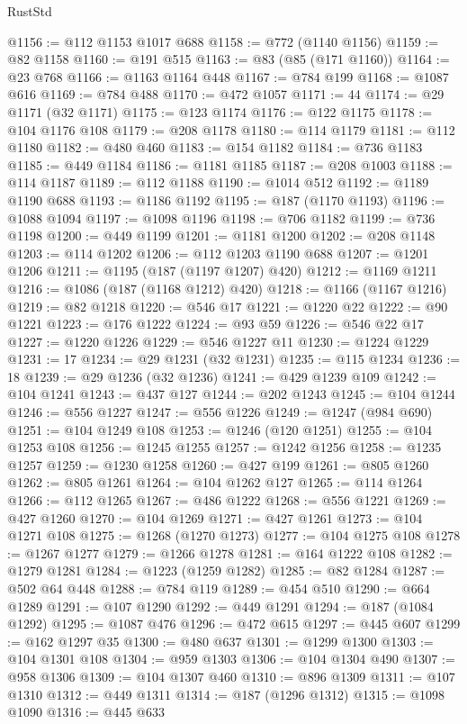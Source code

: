 \begin{lexlean}{RustStd}
\begin{coremodule}
{\begin{coremodule}
{{{{{{{{{{{{{{{{{{{{{{{{{{{{{{{{{{{{{{{{{{{{{{{{{{{{{{{@1156 := @112 @1153 @1017 @688
@1158 := @772 (@1140 @1156)
@1159 := @82 @1158
@1160 := @191 @515
@1163 := @83 (@85 (@171 @1160))
@1164 := @23 @768
@1166 := @1163 @1164 @448
@1167 := @784 @199
@1168 := @1087 @616
@1169 := @784 @488
@1170 := @472 @1057
@1171 := 44
@1174 := @29 @1171 (@32 @1171)
@1175 := @123 @1174
@1176 := @122 @1175
@1178 := @104 @1176 @108
@1179 := @208 @1178
@1180 := @114 @1179
@1181 := @112 @1180
@1182 := @480 @460
@1183 := @154 @1182
@1184 := @736 @1183
@1185 := @449 @1184
@1186 := @1181 @1185
@1187 := @208 @1003
@1188 := @114 @1187
@1189 := @112 @1188
@1190 := @1014 @512
@1192 := @1189 @1190 @688
@1193 := @1186 @1192
@1195 := @187 (@1170 @1193)
@1196 := @1088 @1094
@1197 := @1098 @1196
@1198 := @706 @1182
@1199 := @736 @1198
@1200 := @449 @1199
@1201 := @1181 @1200
@1202 := @208 @1148
@1203 := @114 @1202
@1206 := @112 @1203 @1190 @688
@1207 := @1201 @1206
@1211 := @1195 (@187 (@1197 @1207) @420)
@1212 := @1169 @1211
@1216 := @1086 (@187 (@1168 @1212) @420)
@1218 := @1166 (@1167 @1216)
@1219 := @82 @1218
@1220 := @546 @17
@1221 := @1220 @22
@1222 := @90 @1221
@1223 := @176 @1222
@1224 := @93 @59
@1226 := @546 @22 @17
@1227 := @1220 @1226
@1229 := @546 @1227 @11
@1230 := @1224 @1229
@1231 := 17
@1234 := @29 @1231 (@32 @1231)
@1235 := @115 @1234
@1236 := 18
@1239 := @29 @1236 (@32 @1236)
@1241 := @429 @1239 @109
@1242 := @104 @1241
@1243 := @437 @127
@1244 := @202 @1243
@1245 := @104 @1244
@1246 := @556 @1227
@1247 := @556 @1226
@1249 := @1247 (@984 @690)
@1251 := @104 @1249 @108
@1253 := @1246 (@120 @1251)
@1255 := @104 @1253 @108
@1256 := @1245 @1255
@1257 := @1242 @1256
@1258 := @1235 @1257
@1259 := @1230 @1258
@1260 := @427 @199
@1261 := @805 @1260
@1262 := @805 @1261
@1264 := @104 @1262 @127
@1265 := @114 @1264
@1266 := @112 @1265
@1267 := @486 @1222
@1268 := @556 @1221
@1269 := @427 @1260
@1270 := @104 @1269
@1271 := @427 @1261
@1273 := @104 @1271 @108
@1275 := @1268 (@1270 @1273)
@1277 := @104 @1275 @108
@1278 := @1267 @1277
@1279 := @1266 @1278
@1281 := @164 @1222 @108
@1282 := @1279 @1281
@1284 := @1223 (@1259 @1282)
@1285 := @82 @1284
@1287 := @502 @64 @448
@1288 := @784 @119
@1289 := @454 @510
@1290 := @664 @1289
@1291 := @107 @1290
@1292 := @449 @1291
@1294 := @187 (@1084 @1292)
@1295 := @1087 @476
@1296 := @472 @615
@1297 := @445 @607
@1299 := @162 @1297 @35
@1300 := @480 @637
@1301 := @1299 @1300
@1303 := @104 @1301 @108
@1304 := @959 @1303
@1306 := @104 @1304 @490
@1307 := @958 @1306
@1309 := @104 @1307 @460
@1310 := @896 @1309
@1311 := @107 @1310
@1312 := @449 @1311
@1314 := @187 (@1296 @1312)
@1315 := @1098 @1090
@1316 := @445 @633
}}}}}}}}}}}}}}}}}}}}}}}}}}}}}}}}}}}}}}}}}}}}}}}}}}}}}}}
\end{coremodule}}
\end{coremodule}
\end{lexlean}

